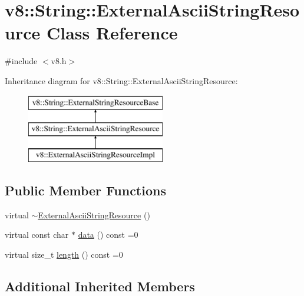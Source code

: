 \hypertarget{classv8_1_1String_1_1ExternalAsciiStringResource}{\section{v8\-:\-:String\-:\-:External\-Ascii\-String\-Resource Class Reference}
\label{classv8_1_1String_1_1ExternalAsciiStringResource}
}


{\ttfamily \#include $<$v8.\-h$>$}

Inheritance diagram for v8\-:\-:String\-:\-:External\-Ascii\-String\-Resource\-:\begin{figure}[H]
\begin{center}
\leavevmode
\includegraphics[height=3.000000cm]{classv8_1_1String_1_1ExternalAsciiStringResource}
\end{center}
\end{figure}
\subsection*{Public Member Functions}
\begin{DoxyCompactItemize}
\item 
virtual \hyperlink{classv8_1_1String_1_1ExternalAsciiStringResource_acd8790ae14be1b90794b363d24a147d0}{$\sim$\-External\-Ascii\-String\-Resource} ()
\item 
virtual const char $\ast$ \hyperlink{classv8_1_1String_1_1ExternalAsciiStringResource_adeb99e8c8c630e2dac5ad76476249d2f}{data} () const =0
\item 
virtual size\-\_\-t \hyperlink{classv8_1_1String_1_1ExternalAsciiStringResource_aeecccc52434c2057d3dc5c9732458a8e}{length} () const =0
\end{DoxyCompactItemize}
\subsection*{Additional Inherited Members}


